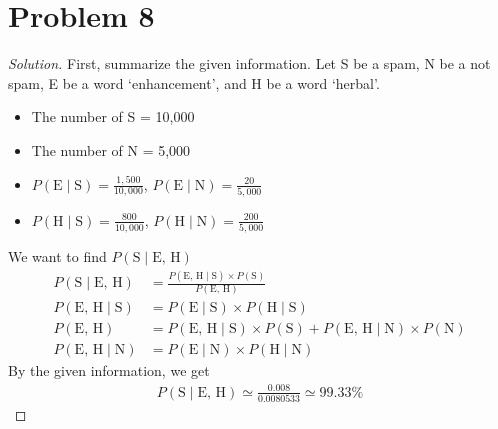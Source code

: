 \section*{Problem 8}
	\begin{proof} [Solution]
		First, summarize the given information. Let S be a spam, N be a not spam, E be a word `enhancement', and H be a word `herbal'.
		\begin{itemize}
			\item The number of S = 10,000
			\item The number of N = 5,000 
			\item $P(\mbox{E} \mid \mbox{S}) = \frac{1,500}{10,000}$, $P(\mbox{E} \mid \mbox{N}) = \frac{20}{5,000}$
			\item $P(\mbox{H} \mid \mbox{S}) = \frac{800}{10,000}$, $P(\mbox{H} \mid \mbox{N}) = \frac{200}{5,000}$
		\end{itemize}
		We want to find $P(\mbox{S} \mid \mbox{E, H})$
		\begin{align*}
			P(\mbox{S} \mid \mbox{E, H}) &= \frac{P(\mbox{E, H} \mid \mbox{S})\times P(\mbox{S})}{P(\mbox{E, H})}\\
			P(\mbox{E, H} \mid \mbox{S}) &= P(\mbox{E} \mid \mbox{S}) \times P(\mbox{H} \mid \mbox{S})\\
			P(\mbox{E, H}) &= P(\mbox{E, H}\mid \mbox{S})\times P(\mbox{S}) + P(\mbox{E, H}\mid \mbox{N})\times P(\mbox{N})\\
			P(\mbox{E, H} \mid \mbox{N}) &= P(\mbox{E} \mid \mbox{N}) \times P(\mbox{H} \mid \mbox{N})
		\end{align*}
		By the given information, we get
		\begin{align*}
			P(\mbox{S} \mid \mbox{E, H}) \simeq \frac{0.008}{0.0080533} \simeq 99.33\%
		\end{align*}
	\end{proof}